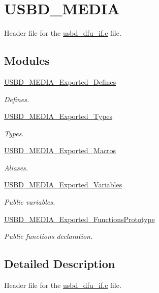 \hypertarget{group__USBD__MEDIA}{}\section{U\+S\+B\+D\+\_\+\+M\+E\+D\+IA}
\label{group__USBD__MEDIA}


Header file for the \hyperlink{usbd__dfu__if_8c}{usbd\+\_\+dfu\+\_\+if.\+c} file.  


\subsection*{Modules}
\begin{DoxyCompactItemize}
\item 
\hyperlink{group__USBD__MEDIA__Exported__Defines}{U\+S\+B\+D\+\_\+\+M\+E\+D\+I\+A\+\_\+\+Exported\+\_\+\+Defines}
\begin{DoxyCompactList}\small\item\em Defines. \end{DoxyCompactList}\item 
\hyperlink{group__USBD__MEDIA__Exported__Types}{U\+S\+B\+D\+\_\+\+M\+E\+D\+I\+A\+\_\+\+Exported\+\_\+\+Types}
\begin{DoxyCompactList}\small\item\em Types. \end{DoxyCompactList}\item 
\hyperlink{group__USBD__MEDIA__Exported__Macros}{U\+S\+B\+D\+\_\+\+M\+E\+D\+I\+A\+\_\+\+Exported\+\_\+\+Macros}
\begin{DoxyCompactList}\small\item\em Aliases. \end{DoxyCompactList}\item 
\hyperlink{group__USBD__MEDIA__Exported__Variables}{U\+S\+B\+D\+\_\+\+M\+E\+D\+I\+A\+\_\+\+Exported\+\_\+\+Variables}
\begin{DoxyCompactList}\small\item\em Public variables. \end{DoxyCompactList}\item 
\hyperlink{group__USBD__MEDIA__Exported__FunctionsPrototype}{U\+S\+B\+D\+\_\+\+M\+E\+D\+I\+A\+\_\+\+Exported\+\_\+\+Functions\+Prototype}
\begin{DoxyCompactList}\small\item\em Public functions declaration. \end{DoxyCompactList}\end{DoxyCompactItemize}


\subsection{Detailed Description}
Header file for the \hyperlink{usbd__dfu__if_8c}{usbd\+\_\+dfu\+\_\+if.\+c} file. 

